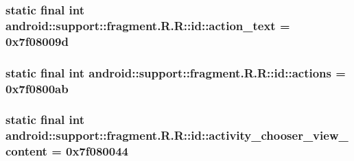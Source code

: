 \hypertarget{classandroid_1_1support_1_1fragment_1_1_r_1_1id_f1d77a78f0de3960b6c2b93f25abb7b5}{
\subsubsection[{action\_\-text}]{\setlength{\rightskip}{0pt plus 5cm}static final int android::support::fragment.R.R::id::action\_\-text = 0x7f08009d}}
\label{classandroid_1_1support_1_1fragment_1_1_r_1_1id_f1d77a78f0de3960b6c2b93f25abb7b5}


\hypertarget{classandroid_1_1support_1_1fragment_1_1_r_1_1id_8ea2d8e0075ddd7aebfa8b82e730204a}{
\subsubsection[{actions}]{\setlength{\rightskip}{0pt plus 5cm}static final int android::support::fragment.R.R::id::actions = 0x7f0800ab}}
\label{classandroid_1_1support_1_1fragment_1_1_r_1_1id_8ea2d8e0075ddd7aebfa8b82e730204a}


\hypertarget{classandroid_1_1support_1_1fragment_1_1_r_1_1id_dd059e64f3be1af01f684bd0428d49ce}{
\subsubsection[{activity\_\-chooser\_\-view\_\-content}]{\setlength{\rightskip}{0pt plus 5cm}static final int android::support::fragment.R.R::id::activity\_\-chooser\_\-view\_\-content = 0x7f080044}}
\label{classandroid_1_1support_1_1fragment_1_1_r_1_1id_dd059e64f3be1af01f684bd0428d49ce}


